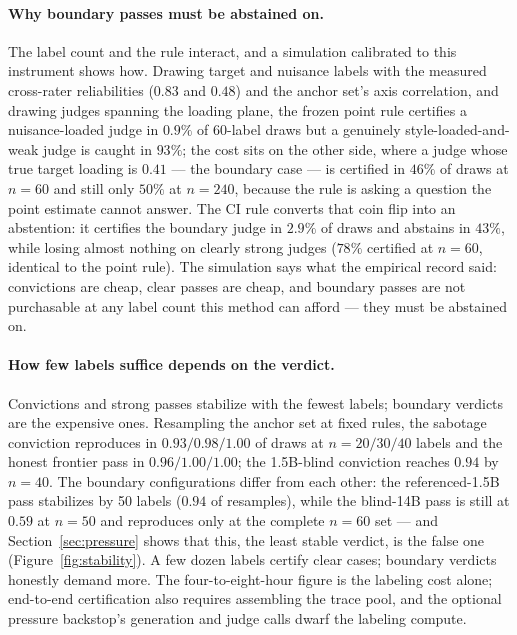 \documentclass[11pt]{article}
\begin{document}
\paragraph{Why boundary passes must be abstained on.}
The label count and the rule interact, and a simulation calibrated to this instrument shows how.
Drawing target and nuisance labels with the measured cross-rater reliabilities ($0.83$ and $0.48$) and the anchor set's axis correlation, and drawing judges spanning the loading plane, the frozen point rule certifies a nuisance-loaded judge in $0.9\%$ of 60-label draws but a genuinely style-loaded-and-weak judge is caught in $93\%$; the cost sits on the other side, where a judge whose true target loading is $0.41$ --- the boundary case --- is certified in $46\%$ of draws at $n{=}60$ and still only $50\%$ at $n{=}240$, because the rule is asking a question the point estimate cannot answer.
The CI rule converts that coin flip into an abstention: it certifies the boundary judge in $2.9\%$ of draws and abstains in $43\%$, while losing almost nothing on clearly strong judges ($78\%$ certified at $n{=}60$, identical to the point rule).
The simulation says what the empirical record said: convictions are cheap, clear passes are cheap, and boundary passes are not purchasable at any label count this method can afford --- they must be abstained on.

\paragraph{How few labels suffice depends on the verdict.}
Convictions and strong passes stabilize with the fewest labels; boundary verdicts are the expensive ones.
Resampling the anchor set at fixed rules, the sabotage conviction reproduces in $0.93/0.98/1.00$ of draws at $n = 20/30/40$ labels and the honest frontier pass in $0.96/1.00/1.00$; the 1.5B-blind conviction reaches $0.94$ by $n{=}40$.
The boundary configurations differ from each other: the referenced-1.5B pass stabilizes by 50 labels ($0.94$ of resamples), while the blind-14B pass is still at $0.59$ at $n{=}50$ and reproduces only at the complete $n{=}60$ set --- and Section~\ref{sec:pressure} shows that this, the least stable verdict, is the false one (Figure~\ref{fig:stability}).
A few dozen labels certify clear cases; boundary verdicts honestly demand more.
The four-to-eight-hour figure is the labeling cost alone; end-to-end certification also requires assembling the trace pool, and the optional pressure backstop's generation and judge calls dwarf the labeling compute.
\end{document}
